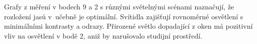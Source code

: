 Grafy z měření v bodech 9 a 2 s různými světelnými scénami naznačují, že rozložení jasů v~učebně je optimální.
Svítidla zajišťují rovnoměrné osvětlení s minimálními kontrasty a odrazy.
Přirozené světlo dopadající z oken má pozitivní vliv na osvětlení v bodě 2, aniž by narušovalo studijní prostředí.




























